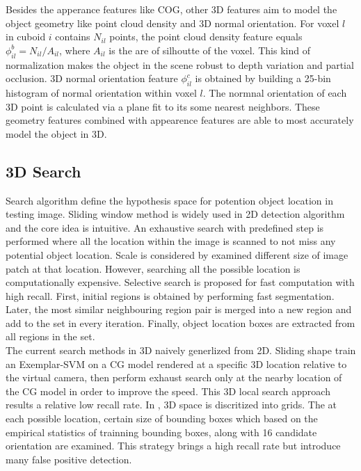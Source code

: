 \documentclass[english]{ccdconf}
\begin{document}
 Besides the apperance features like COG, other 3D features aim to model the object geometry like point cloud density and 3D normal orientation. For voxel $l$ in cuboid $i$ contains $N_{il}$ points, the point cloud density feature equals $\phi_{il}^b=N_{il}/A_{il}$, where $A_{il}$ is the are of silhoutte of the voxel. This kind of normalization makes the object in the scene robust to depth variation and partial occlusion. 3D normal orientation feature $\phi_{il}^c$ is obtained by building a 25-bin histogram of normal orientation within voxel $l$. The normnal orientation of each 3D point is calculated via a plane fit to its some nearest neighbors. These geometry features combined with appearence features are able to most accurately model the object in 3D.
\subsection{3D Search}
\label{3D Search}
Search algorithm define the hypothesis space for potention object location in testing image. Sliding window method is widely used in 2D detection algorithm\cite{dalal2005histograms,felzenszwalb2010object} and the core idea is intuitive.  An exhaustive search with predefined step is performed where all the location within the image is scanned to not miss any potential object location. Scale is considered by examined different size of image patch at that location. However, searching all the possible location is computationally expensive. Selective search is proposed for fast computation with high recall\cite{uijlings2013selective}. First, initial regions is obtained by performing fast segmentation\cite{felzenszwalb2004efficient}. Later, the most similar neighbouring region pair is merged into a new region and add to the set in every iteration. Finally, object location boxes are extracted from all regions in the set.\\
The current search methods in 3D naively generlized from 2D. Sliding shape\cite{song2014sliding} train an Exemplar-SVM on a CG model rendered at a specific 3D location relative to the virtual camera, then perform exhaust search only at the nearby location of the CG model in order to improve the speed. This 3D local search approach results a relative low recall rate. In \cite{ren2016three}, 3D space is discritized into grids. The at each possible location, certain size of bounding boxes which based on the empirical statistics of trainning bounding boxes, along with 16 candidate orientation are examined. This strategy brings a high recall rate but introduce many false positive detection.\\
\end{document}
